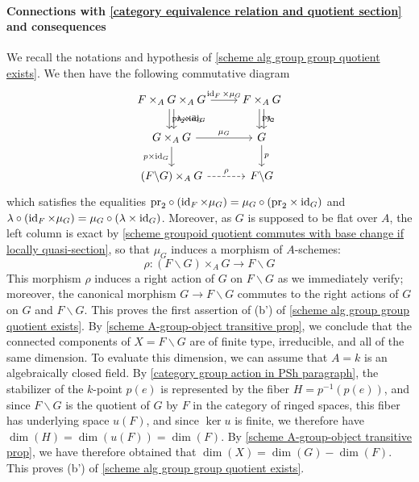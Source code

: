 \paragraph{Connections with \autoref{category equivalence relation and quotient section} and consequences}\label{scheme alg group group quotient and sheaf quotient paragraph}
We recall the notations and hypothesis of \cref{scheme alg group group quotient exists}. We then have the following commutative diagram
\[\begin{tikzcd}
F\times_AG\times_AG\ar[r,"\id_F\times\mu_G"]\ar[d,shift left=2pt,"\lambda\times\id_G"]\ar[d,shift right=2pt,"\pr_2\times\id_G"]&F\times_AG\ar[d,shift left=2pt,"\lambda"]\ar[d,shift right=2pt,"\pr_2"]\\
G\times_AG\ar[r,"\mu_G"]\ar[d,swap,"p\times\id_G"]&G\ar[d,"p"]\\
(F\backslash G)\times_AG\ar[r,dashed,"\rho"]&F\backslash G
\end{tikzcd}\]
which satisfies the equalities $\mathrm{pr}_2\circ(\operatorname{id}_F\times\mu_G)=\mu_G\circ(\mathrm{pr}_2\times\operatorname{id}_G)$ and $\lambda\circ(\operatorname{id}_F\times\mu_G)=\mu_G\circ(\lambda\times\operatorname{id}_G)$. Moreover, as $G$ is supposed to be flat over $A$, the left column is exact by \cref{scheme groupoid quotient commutes with base change if locally quasi-section}, so that $\mu_G$ induces a morphism of $A$-schemes:
\[\rho:(F\backslash G)\times_AG\to F\backslash G\]
This morphism $\rho$ induces a right action of $G$ on $F\backslash G$ as we immediately verify; moreover, the canonical morphism $G\to F\backslash G$ commutes to the right actions of $G$ on $G$ and $F\backslash G$. This proves the first assertion of (b') of \cref{scheme alg group group quotient exists}. By \cref{scheme A-group-object transitive prop}, we conclude that the connected components of $X=F\backslash G$ are of finite type, irreducible, and all of the same dimension. To evaluate this dimension, we can assume that $A=k$ is an algebraically closed field. By \ref{category group action in PSh paragraph}, the stabilizer of the $k$-point $p(e)$ is represented by the fiber $H=p^{-1}(p(e))$, and since $F\backslash G$ is the quotient of $G$ by $F$ in the category of ringed spaces, this fiber has underlying space $u(F)$, and since $\ker u$ is finite, we therefore have $\dim(H)=\dim(u(F))=\dim(F)$. By \cref{scheme A-group-object transitive prop}, we have therefore obtained that $\dim(X)=\dim(G)-\dim(F)$. This proves (b') of \cref{scheme alg group group quotient exists}.\par
